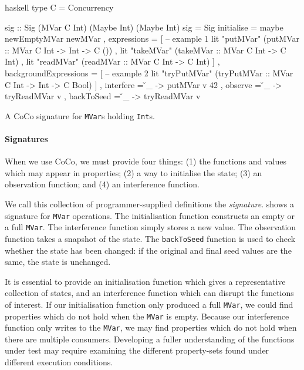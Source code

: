 \begin{listing}
\centering
\begin{cminted}{haskell}
type C = Concurrency

sig :: Sig (MVar C Int) (Maybe Int) (Maybe Int)
sig = Sig
  { initialise  = maybe newEmptyMVar newMVar
  , expressions =
    [ -- example 1
      lit "putMVar"  (putMVar  :: MVar C Int -> Int -> C ())
    , lit "takeMVar" (takeMVar :: MVar C Int -> C Int)
    , lit "readMVar" (readMVar :: MVar C Int -> C Int)
    ]
  , backgroundExpressions =
    [ -- example 2
      lit "tryPutMVar" (tryPutMVar :: MVar C Int -> Int -> C Bool)
    ]
  , interfere  = \v _ -> putMVar v 42
  , observe    = \v _ -> tryReadMVar v
  , backToSeed = \v _ -> tryReadMVar v
  }
\end{cminted}
\caption{A CoCo signature for \texttt{MVar}s holding \texttt{Int}s.}\label{lst:mvar}
\end{listing}

\paragraph{Signatures}
When we use CoCo, we must provide four things: (1) the functions and
values which may appear in properties; (2) a way to initialise the
state; (3) an observation function; and (4) an interference function.

We call this collection of programmer-supplied definitions the
\emph{signature}.   shows a signature for \verb|MVar|
operations.  The initialisation function constructs an empty or a full
\verb|MVar|.  The interference function simply stores a new value.
The observation function takes a snapshot of the state.  The
\verb|backToSeed| function is used to check whether the state has been
changed: if the original and final seed values are the same, the state
is unchanged.

It is essential to provide an initialisation function which gives a
representative collection of states, and an interference function
which can disrupt the functions of interest.  If our initialisation
function only produced a full \verb|MVar|, we could find properties
which do not hold when the \verb|MVar| is empty.  Because our
interference function only writes to the \verb|MVar|, we may find
properties which do not hold when there are multiple consumers.
Developing a fuller understanding of the functions under test may
require examining the different property-sets found under different
execution conditions.


